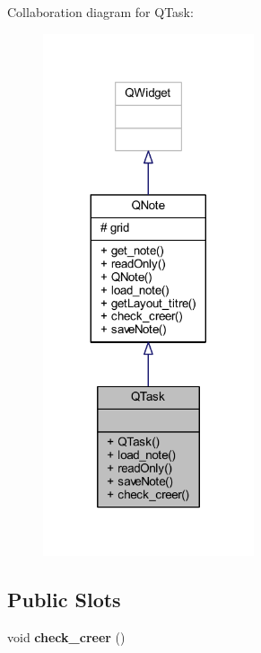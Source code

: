 Collaboration diagram for Q\+Task\+:\nopagebreak
\begin{figure}[H]
\begin{center}
\leavevmode
\includegraphics[width=176pt]{class_q_task__coll__graph}
\end{center}
\end{figure}
\subsection*{Public Slots}
\begin{DoxyCompactItemize}
\item 
\mbox{\label{class_q_task_a9ee271061467da09180f8106734bb327}} 
void {\bfseries check\+\_\+creer} ()
\end{DoxyCompactItemize}
